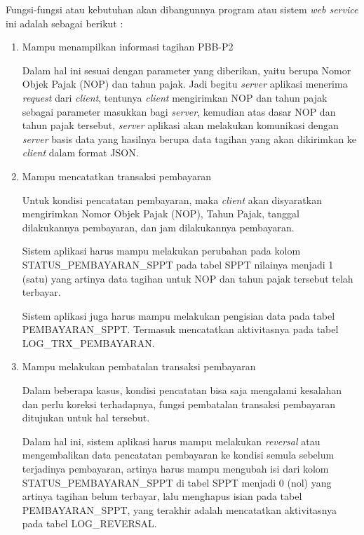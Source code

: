 \documentclass[pdftex,12pt, oneside]{article}
\begin{document}
Fungsi-fungsi atau kebutuhan akan dibangunnya program atau sistem \textit{web service} ini adalah sebagai berikut :

\begin{enumerate}[1.]
  \item Mampu menampilkan informasi tagihan PBB-P2
  
  Dalam hal ini sesuai dengan parameter yang diberikan, yaitu berupa Nomor Objek Pajak (NOP) dan tahun pajak. Jadi begitu \textit{server} aplikasi menerima \textit{request} dari \textit{client}, tentunya \textit{client} mengirimkan NOP dan tahun pajak sebagai parameter masukkan bagi \textit{server}, kemudian atas dasar NOP dan tahun pajak tersebut, \textit{server} aplikasi akan melakukan komunikasi dengan \textit{server} basis data yang hasilnya berupa data tagihan yang akan dikirimkan ke \textit{client} dalam format JSON.
  
  \item Mampu mencatatkan transaksi pembayaran
  
  Untuk kondisi pencatatan pembayaran, maka \textit{client} akan disyaratkan mengirimkan Nomor Objek Pajak (NOP), Tahun Pajak, tanggal dilakukannya pembayaran, dan jam dilakukannya pembayaran. 
  
  Sistem aplikasi harus mampu melakukan perubahan pada kolom STATUS\_PEMBAYARAN\_SPPT pada tabel SPPT nilainya menjadi 1 (satu) yang artinya data tagihan untuk NOP dan tahun pajak tersebut telah terbayar.
  
  Sistem aplikasi juga harus mampu melakukan pengisian data pada tabel PEMBAYARAN\_SPPT. Termasuk mencatatkan aktivitasnya pada tabel LOG\_TRX\_PEMBAYARAN.
  
  \item Mampu melakukan pembatalan transaksi pembayaran
  
  Dalam beberapa kasus, kondisi pencatatan bisa saja mengalami kesalahan dan perlu koreksi terhadapnya, fungsi pembatalan transaksi pembayaran ditujukan untuk hal tersebut.
  
  Dalam hal ini, sistem aplikasi harus mampu melakukan \textit{reversal} atau mengembalikan data pencatatan pembayaran ke kondisi semula sebelum terjadinya pembayaran, artinya harus mampu mengubah isi dari kolom STATUS\_PEMBAYARAN\_SPPT di tabel SPPT menjadi 0 (nol) yang artinya tagihan belum terbayar, lalu menghapus isian pada tabel PEMBAYARAN\_SPPT, yang terakhir adalah mencatatkan aktivitasnya pada tabel LOG\_REVERSAL.
\end{enumerate}
\end{document}
